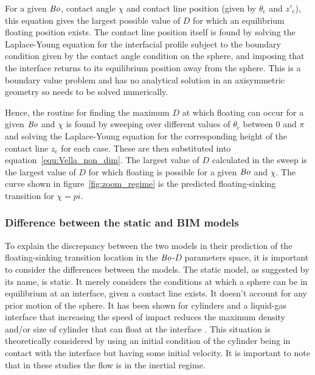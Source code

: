 \documentclass[12pt]{article}
\newcommand\Bo{\mbox{\textit{Bo}}}  %
\begin{document}
For a given $\Bo$, contact angle $\chi$ and contact line position (given by $\theta_{\text{c}}$ and $z'_{\text{c}}$), this equation gives the largest possible value of $D$ for which an equilibrium floating position exists. The contact line position itself is found by solving the Laplace-Young equation for the interfacial profile subject to the boundary condition given by the contact angle condition on the sphere, and imposing that the interface returns to its equilibrium position away from the sphere. This is a boundary value problem \citep{Riley06} and has no analytical solution in an axisymmetric geometry so needs to be solved numerically. 

Hence, the routine for finding the maximum $D$ at which floating can occur for a given $\Bo$ and $\chi$ is found by sweeping over different values of $\theta_{\text{c}}$ between $0$ and $\pi$ and solving the Laplace-Young equation for the corresponding height of the contact line $z_{\text{c}}$ for each case. These are then substituted into equation~\ref{equ:Vella_non_dim}. The largest value of $D$ calculated in the sweep is the largest value of $D$ for which floating is possible for a given $\Bo$ and $\chi$. The curve shown in figure~\ref{fig:zoom_regime} is the predicted floating-sinking transition for $\chi = pi$.

\subsubsection{Difference between the static and BIM models}
\label{subsubsec:model_diff}

To explain the discrepancy between the two models in their prediction of the floating-sinking transition location in the $\Bo$-$D$ parameters space, it is important to consider the differences between the models. The static model, as suggested by its name, is static. It merely considers the conditions at which a sphere can be in equilibrium at an interface, given a contact line exists. It doesn't account for any prior motion of the sphere. It has been shown for cylinders and a liquid-gas interface that increasing the speed of impact reduces the maximum density and/or size of cylinder that can float at the interface \citet{Vella07, Vella10}. This situation is theoretically considered by using an initial condition of the cylinder being in contact with the interface but having some initial velocity. It is important to note that in these studies the flow is in the inertial regime.
\end{document}
